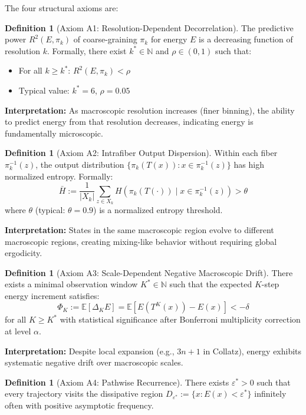 \documentclass[11pt,a4paper]{article}
\theoremstyle{plain}
\theoremstyle{definition}
\newtheorem{definition}[theorem]{Definition}
\theoremstyle{remark}
\newcommand{\N}{\mathbb{N}}
\newcommand{\E}{\mathbb{E}}
\begin{document}
The four structural axioms are:

\begin{definition}[Axiom A1: Resolution-Dependent Decorrelation]
\label{ax:a1}
The predictive power $R^2(E, \pi_k)$ of coarse-graining $\pi_k$ for energy $E$ is a decreasing function of resolution $k$. Formally, there exist $k^* \in \N$ and $\rho \in (0,1)$ such that:
\begin{itemize}
    \item For all $k \ge k^*$: $R^2(E, \pi_k) < \rho$
    \item Typical value: $k^* = 6$, $\rho = 0.05$
\end{itemize}
\end{definition}

\textbf{Interpretation:} As macroscopic resolution increases (finer binning), the ability to predict energy from that resolution decreases, indicating energy is fundamentally microscopic.

\begin{definition}[Axiom A2: Intrafiber Output Dispersion]
\label{ax:a2}
Within each fiber $\pi_k^{-1}(z)$, the output distribution $\{\pi_k(T(x)) : x \in \pi_k^{-1}(z)\}$ has high normalized entropy. Formally:
\[
\bar{H} := \frac{1}{|X_k|} \sum_{z \in X_k} H(\pi_k(T(\cdot)) \mid x \in \pi_k^{-1}(z)) > \theta
\]
where $\theta$ (typical: $\theta = 0.9$) is a normalized entropy threshold.
\end{definition}

\textbf{Interpretation:} States in the same macroscopic region evolve to different macroscopic regions, creating mixing-like behavior without requiring global ergodicity.

\begin{definition}[Axiom A3: Scale-Dependent Negative Macroscopic Drift]
\label{ax:a3}
There exists a minimal observation window $K^* \in \N$ such that the expected $K$-step energy increment satisfies:
\[
\Phi_K := \E[\Delta_K E] = \E[E(T^K(x)) - E(x)] < -\delta
\]
for all $K \ge K^*$ with statistical significance after Bonferroni multiplicity correction at level $\alpha$.
\end{definition}

\textbf{Interpretation:} Despite local expansion (e.g., $3n+1$ in Collatz), energy exhibits systematic negative drift over macroscopic scales.

\begin{definition}[Axiom A4: Pathwise Recurrence]
\label{ax:a4}
There exists $\varepsilon^* > 0$ such that every trajectory visits the dissipative region $D_{\varepsilon^*} := \{x : E(x) < \varepsilon^*\}$ infinitely often with positive asymptotic frequency.
\end{definition}
\end{document}
